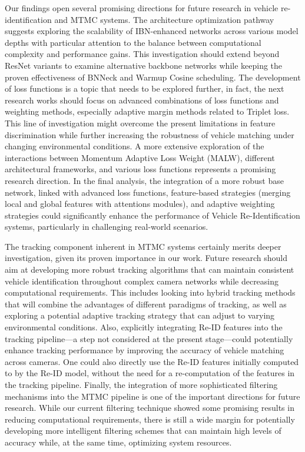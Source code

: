 Our findings open several promising directions for future research in vehicle re-identification and MTMC systems. The architecture optimization pathway suggests exploring the scalability of IBN-enhanced networks across various model depths with particular attention to the balance between computational complexity and performance gains. This investigation should extend beyond ResNet variants to examine alternative backbone networks while keeping the proven effectiveness of BNNeck and Warmup Cosine scheduling.
The development of loss functions is a topic that needs to be explored further, in fact, the next research works should focus on advanced combinations of loss functions and weighting methods, especially adaptive margin methods related to Triplet loss. This line of investigation might overcome the present limitations in feature discrimination while further increasing the robustness of vehicle matching under changing environmental conditions.
A more extensive exploration of the interactions between Momentum Adaptive Loss Weight (MALW), different architectural frameworks, and various loss functions represents a promising research direction. In the final analysis, the integration of a more robust base network, linked with advanced loss functions, feature-based strategies (merging local and global features with attentions modules), and adaptive weighting strategies could significantly enhance the performance of Vehicle Re-Identification systems, particularly in challenging real-world scenarios.

The tracking component inherent in MTMC systems certainly merits deeper investigation, given its proven importance in our work. Future research should aim at developing more robust tracking algorithms that can maintain consistent vehicle identification throughout complex camera networks while decreasing computational requirements. This includes looking into hybrid tracking methods that will combine the advantages of different paradigms of tracking, as well as exploring a potential adaptive tracking strategy that can adjust to varying environmental conditions. Also, explicitly integrating Re-ID features into the tracking pipeline—a step not considered at the present stage—could potentially enhance tracking performance by improving the accuracy of vehicle matching across cameras. One could also directly use the Re-ID features initially computed to by the Re-ID model, without the need for a re-computation of the features in the tracking pipeline.
Finally, the integration of more sophisticated filtering mechanisms into the MTMC pipeline is one of the important directions for future research. While our current filtering technique showed some promising results in reducing computational requirements, there is still a wide margin for potentially developing more intelligent filtering schemes that can maintain high levels of accuracy while, at the same time, optimizing system resources.
